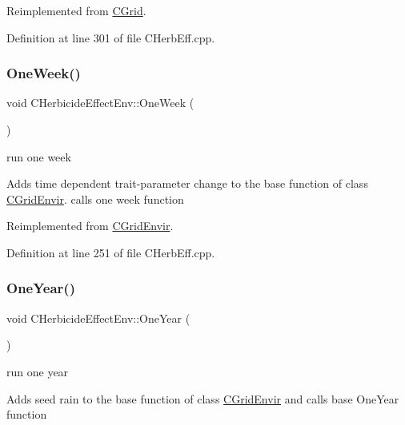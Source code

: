 Reimplemented from \mbox{\hyperlink{class_c_grid_afadbdedcfbe006bf9009308e3631028c}{C\+Grid}}.



Definition at line 301 of file C\+Herb\+Eff.\+cpp.

\mbox{\label{class_c_herbicide_effect_env_a82fba7cb44890dd47d5e594f72803241}} 
\subsubsection{\texorpdfstring{OneWeek()}{OneWeek()}}
{\footnotesize\ttfamily void C\+Herbicide\+Effect\+Env\+::\+One\+Week (\begin{DoxyParamCaption}{ }\end{DoxyParamCaption})\hspace{0.3cm}{\ttfamily [virtual]}}



run one week 

Adds time dependent trait-\/parameter change to the base function of class \mbox{\hyperlink{class_c_grid_envir}{C\+Grid\+Envir}}. calls one week function 

Reimplemented from \mbox{\hyperlink{class_c_grid_envir_a5c5cde58adbcee3ec3fd54c734228bf6}{C\+Grid\+Envir}}.



Definition at line 251 of file C\+Herb\+Eff.\+cpp.

\mbox{\label{class_c_herbicide_effect_env_ac62e9a406dcb24c30798bff6a369282b}} 
\subsubsection{\texorpdfstring{OneYear()}{OneYear()}}
{\footnotesize\ttfamily void C\+Herbicide\+Effect\+Env\+::\+One\+Year (\begin{DoxyParamCaption}{ }\end{DoxyParamCaption})\hspace{0.3cm}{\ttfamily [virtual]}}



run one year 

Adds seed rain to the base function of class \mbox{\hyperlink{class_c_grid_envir}{C\+Grid\+Envir}} and calls base One\+Year function 

